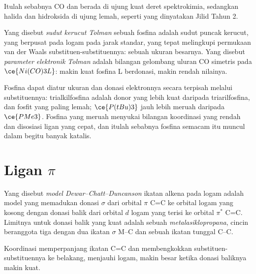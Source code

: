 Itulah sebabnya CO dan  berada di ujung kuat deret spektrokimia, sedangkan
halida dan hidroksida di ujung lemah, seperti yang dinyatakan Jilid Tahun 2.

\begin{definition}\label{def:b3:organometallic-bonding:tolman}
Yang disebut \emph{sudut kerucut Tolman} sebuah fosfina adalah sudut
puncak kerucut, yang berpusat pada logam pada jarak standar, yang tepat
melingkupi permukaan van der Waals substituen-substituennya: sebuah ukuran besarnya.
Yang disebut \emph{parameter elektronik Tolman} adalah
bilangan gelombang uluran CO simetris pada $\ce{Ni(CO)3L}$: makin kuat
fosfina L berdonasi, makin rendah nilainya.
\end{definition}

Fosfina dapat diatur ukuran dan donasi elektronnya secara terpisah melalui
substituennya: trialkilfosfina adalah donor yang lebih kuat daripada triarilfosfina,
dan fosfit yang paling lemah; $\ce{P(tBu)3}$ jauh lebih meruah daripada $\ce{PMe3}$. Fosfina yang meruah menyukai
bilangan koordinasi yang rendah dan disosiasi ligan yang cepat, dan itulah sebabnya fosfina semacam itu
muncul dalam begitu banyak katalis.

\section{Ligan $\pi$}

\begin{definition}\label{def:b3:organometallic-bonding:dcd}
Yang disebut \emph{model Dewar--Chatt--Duncanson}
ikatan alkena pada logam adalah model yang memadukan donasi $\sigma$ dari orbital $\pi$ C=C
ke orbital logam yang kosong dengan donasi balik dari orbital $d$ logam yang terisi ke
orbital $\pi^*$ C=C. Limitnya untuk donasi balik yang kuat adalah sebuah
\emph{metalasiklopropana}, cincin beranggota tiga
dengan dua ikatan $\sigma$ M--C dan sebuah ikatan tunggal C--C.
\end{definition}

\begin{proposition}\label{prop:b3:organometallic-bonding:dcd}
Koordinasi memperpanjang ikatan C=C dan membengkokkan substituen-substituennya ke belakang, menjauhi
logam, makin besar ketika donasi baliknya makin kuat.
\end{proposition}

